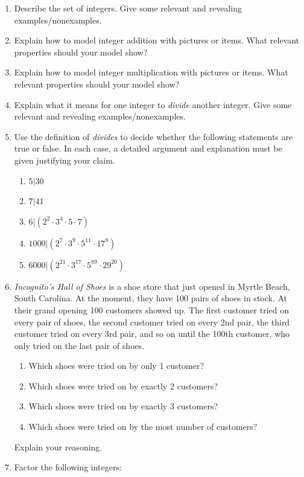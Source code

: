 \begin{problems}
\begin{enumerate}
\item Describe the set of integers. Give some relevant and revealing
  examples/nonexamples.
\item Explain how to model integer addition with pictures or
  items. What relevant properties should your model show?
\item Explain how to model integer multiplication with pictures or
  items. What relevant properties should your model show?
\item Explain what it means for one integer to \textit{divide} another
  integer. Give some relevant and revealing examples/nonexamples.
\item Use the definition of \textit{divides} to decide whether the
  following statements are true or false. In each case, a detailed
  argument and explanation must be given justifying your claim.
\begin{enumerate}
\item $5|30$
\item $7|41$
\item $6|(2^2\cdot 3^4\cdot 5 \cdot 7)$
\item $1000|(2^7\cdot 3^9\cdot 5^{11}\cdot 17^8)$
\item $6000|(2^{21}\cdot 3^{17}\cdot 5^{89}\cdot 29^{20})$
\end{enumerate}
\item \textit{Incognito's Hall of Shoes} is a shoe store that just
  opened in Myrtle Beach, South Carolina. At the moment, they have 100
  pairs of shoes in stock. At their grand opening 100 customers showed
  up. The first customer tried on every pair of shoes, the second
  customer tried on every 2nd pair, the third customer tried on every
  3rd pair, and so on until the 100th customer, who only tried on the
  last pair of shoes.
\begin{enumerate}
\item Which shoes were tried on by only 1 customer?
\item Which shoes were tried on by exactly 2 customers?
\item Which shoes were tried on by exactly 3 customers?
\item Which shoes were tried on by the most number of customers?
\end{enumerate}
Explain your reasoning.
\item Factor the following integers:
\begin{enumerate}

\end{enumerate}
\end{enumerate}
\end{problems}
